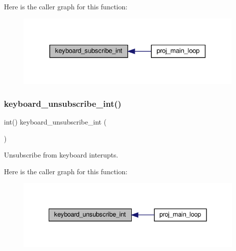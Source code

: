 Here is the caller graph for this function\+:\nopagebreak
\begin{figure}[H]
\begin{center}
\leavevmode
\includegraphics[width=317pt]{group__keyboard_gaefd0e3aafc75eb71df4d778f356b6dd7_icgraph}
\end{center}
\end{figure}
\mbox{\label{group__keyboard_ga32cc4de66854f8a7bd909e7aa8b901ed}} 
\subsubsection{\texorpdfstring{keyboard\+\_\+unsubscribe\+\_\+int()}{keyboard\_unsubscribe\_int()}}
{\footnotesize\ttfamily int() keyboard\+\_\+unsubscribe\+\_\+int (\begin{DoxyParamCaption}{ }\end{DoxyParamCaption})}



Unsubscribe from keyboard interupts. 

Here is the caller graph for this function\+:\nopagebreak
\begin{figure}[H]
\begin{center}
\leavevmode
\includegraphics[width=328pt]{group__keyboard_ga32cc4de66854f8a7bd909e7aa8b901ed_icgraph}
\end{center}
\end{figure}
\mbox{\label{group__keyboard_gad6f191b6116f8df3e057322f0c76b66a}} 
